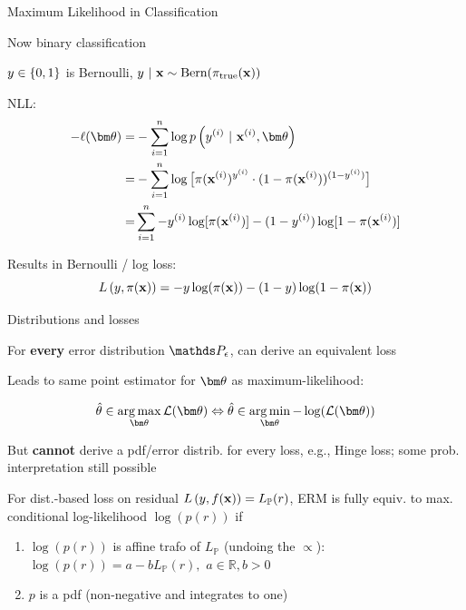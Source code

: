 \documentclass[11pt,compress,t,notes=noshow, xcolor=table]{beamer}
\begin{document}
\begin{framei}[sep=M]{Maximum Likelihood in Classification}

\item Now binary classification
\item $y \in \{0, 1\}$ is Bernoulli, $y ~|~ \mathbf{x} \sim \text{Bern}(\pi_\text{true}(\mathbf{x}))$
\item  NLL:
\begin{align*}
- \loglt =& -\sumin \lpdfyigxit \\ 
=& - \sumin \log \big[\pi(\xi)^{y^{(i)}} \cdot (1 - \pi(\xi))^{(1 - y^{(i)})} \big]\\
=& \sumin -\yi \log[\pi(\xi)] - (1-\yi) \log [1 - \pi(\xi)]
\end{align*}
\item Results in Bernoulli / log loss:
$$
L\left(y, \pi(\mathbf{x})\right) = -y\log(\pi(\mathbf{x}))-(1-y)\log(1-\pi(\mathbf{x}))
$$

\end{framei}


\begin{framei}[sep=L]{Distributions and losses}

\item For \textbf{every} error distribution $\P_\eps$, can derive an equivalent loss
\item Leads to same point estimator for $\thetav$ as maximum-likelihood:

$$
\thetah \in \argmax_{\thetav} \LL(\thetav) \Leftrightarrow \thetah \in \argmin_{\thetav}-\log(\LL(\thetav))
$$
    
\item But \textbf{cannot} derive a pdf/error distrib. for every loss, e.g., Hinge loss; some prob. interpretation still possible 

\item For dist.-based loss on residual $L\left(y, f(\mathbf{x})\right)=L_{\mathbb{P}}(r)$, ERM is fully equiv. to max. conditional log-likelihood $\log(p(r))$ if
\begin{enumerate}
\item $\log(p(r))$ is affine trafo of $L_{\mathbb{P}}$ (undoing the $\propto$):
$\log(p(r)) = a - bL_{\mathbb{P}}(r),\,\,a \in \mathbb{R}, b>0$
\item  $p$ is a pdf (non-negative and integrates to one)
\end{enumerate}

\end{framei}


\endlecture
\end{document}

